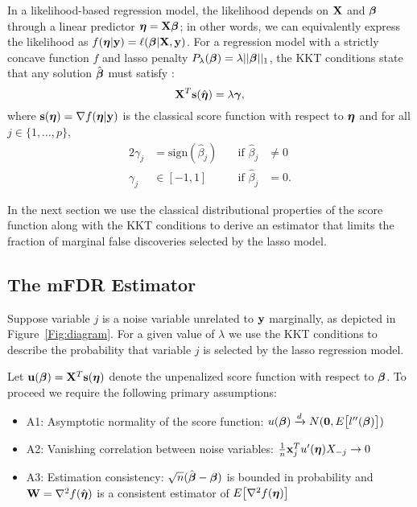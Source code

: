 In a likelihood-based regression model, the likelihood depends on $\mathbf{X}$ and $\boldsymbol{\beta}$ through a linear predictor $\boldsymbol{\eta} = \mathbf{X}\boldsymbol{\beta}$; in other words, we can equivalently express the likelihood as $f(\boldsymbol{\eta}|\mathbf{y})=\ell(\boldsymbol{\beta}|\mathbf{X},\mathbf{y})$.  For a regression model with a strictly concave function $f$ and lasso penalty $P_{\lambda} (\boldsymbol{\beta}) = \lambda||\boldsymbol{\beta}||_1$, the KKT conditions state that any solution $\hat{\boldsymbol{\beta}}$ must satisfy \citep{lasso_kkt}:
\begin{equation*}
\mathbf{X}^T\mathbf{s}(\hat{\boldsymbol{\eta}}) = \lambda\boldsymbol{\gamma},
\end{equation*}
where $\mathbf{s}(\boldsymbol{\eta}) = \nabla f(\boldsymbol{\eta}|\mathbf{y})$ is the classical score function with respect to $\boldsymbol{\eta}$ and for all  $j \in \{1, \ldots, p\}$,
\begin{alignat*}{2}
\gamma_j & = \textrm{sign}(\hat{\beta}_j) &\quad \text{if } \hat{\beta}_j &\neq 0 \\
\gamma_j & \in [-1,1]  &\quad \text{if }  \hat{\beta}_j &= 0.
\end{alignat*}


In the next section we use the classical distributional properties of the score function along with the KKT conditions to derive an estimator that limits the fraction of marginal false discoveries selected by the lasso model.

\subsection{The mFDR Estimator}

Suppose variable $j$ is a noise variable unrelated to $\mathbf{y}$ marginally, as depicted in Figure~\ref{Fig:diagram}. For a given value of $\lambda$ we use the KKT conditions to describe the probability that variable $j$ is selected by the lasso regression model.

Let $\mathbf{u}(\boldsymbol{\beta}) = \mathbf{X}^T \mathbf{s}(\boldsymbol{\eta})$ denote the unpenalized score function with respect to $\boldsymbol{\beta}$.  To proceed we require the following primary assumptions: 

\begin{itemize}
\item A1: Asymptotic normality of the score function: $u(\boldsymbol{\beta}) \xrightarrow{d} N(\mathbf{0},  E\big[l''(\boldsymbol{\beta})\big])$
\item A2: Vanishing correlation between noise variables: $\frac{1}{n}\mathbf{x}_j^T u'(\boldsymbol{\eta})X_{-j} \rightarrow 0$
\item A3: Estimation consistency: $\sqrt{n}(\hat{\boldsymbol{\beta}}-  \boldsymbol{\beta})$ is bounded in probability and $\mathbf{W} = \nabla^2 f(\hat{\boldsymbol{\eta}})$ is a consistent estimator of $E\big[\nabla^2 f(\boldsymbol{\eta})\big]$
\end{itemize}

